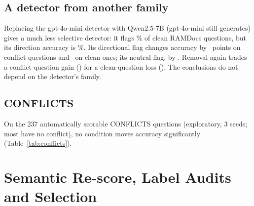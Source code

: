\subsection{A detector from another family}
Replacing the gpt-4o-mini detector with Qwen2.5-7B (gpt-4o-mini still generates) gives a much less selective
detector: it flags \qdetFpr\% of clean RAMDocs questions, but its direction accuracy is \qdetDir\%. Its directional
flag changes accuracy by \zQDetLlmDirFlagDirectionalConflict\ points on conflict questions and \zQDetLlmDirFlagDirectionalClean\ on
clean ones; its neutral flag, by \zQDetLlmDirFlagConflict. Removal again trades a conflict-question gain
(\zQDetLlmDirRemoveSuspectConflict) for a clean-question loss (\zQDetLlmDirRemoveSuspectClean). The conclusions do
not depend on the detector's family.

\subsection{CONFLICTS}
On the 237 automatically scorable CONFLICTS questions (exploratory, 3 seeds; most have no conflict), no condition
moves accuracy significantly (Table~\ref{tab:conflicts}).

\section{Semantic Re-score, Label Audits and Selection}
\label{app:semantic}

